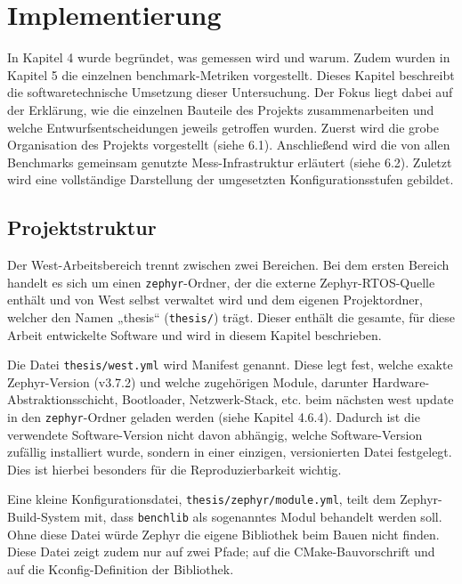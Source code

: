 \chapter{Implementierung}

In Kapitel 4 wurde begründet, was gemessen wird und warum. Zudem wurden in Kapitel 5 die einzelnen benchmark-Metriken vorgestellt. Dieses Kapitel beschreibt die softwaretechnische Umsetzung dieser Untersuchung. Der Fokus liegt dabei auf der Erklärung, wie die einzelnen Bauteile des Projekts zusammenarbeiten und welche Entwurfsentscheidungen jeweils getroffen wurden. Zuerst wird die grobe Organisation des Projekts vorgestellt (siehe 6.1). Anschließend wird die von allen Benchmarks gemeinsam genutzte Mess-Infrastruktur erläutert (siehe 6.2). Zuletzt wird eine vollständige Darstellung der umgesetzten Konfigurationsstufen gebildet.

\section{Projektstruktur}
Der West-Arbeitsbereich trennt zwischen zwei Bereichen. Bei dem ersten Bereich handelt es sich um einen \lstinline[style=fileinline]|zephyr|-Ordner, der die externe Zephyr-RTOS-Quelle enthält und von West selbst verwaltet wird und dem eigenen Projektordner, welcher den Namen „thesis“ (\lstinline[style=fileinline]|thesis/|) trägt. Dieser enthält die gesamte, für diese Arbeit entwickelte Software und wird in diesem Kapitel beschrieben.

Die Datei \lstinline[style=fileinline]|thesis/west.yml| wird Manifest genannt. Diese legt fest, welche exakte Zephyr-Version (v3.7.2) und welche zugehörigen Module, darunter Hardware-Abstraktionsschicht, Bootloader, Netzwerk-Stack, etc. beim nächsten west update in den \lstinline[style=fileinline]|zephyr|-Ordner geladen werden (siehe Kapitel 4.6.4). Dadurch ist die verwendete Software-Version nicht davon abhängig, welche Software-Version zufällig installiert wurde, sondern in einer einzigen, versionierten Datei festgelegt. Dies ist hierbei besonders für die Reproduzierbarkeit wichtig.

Eine kleine Konfigurationsdatei, \lstinline[style=fileinline]|thesis/zephyr/module.yml|, teilt dem Zephyr-Build-System mit, dass \lstinline[style=fileinline]|benchlib| als sogenanntes Modul behandelt werden soll. Ohne diese Datei würde Zephyr die eigene Bibliothek beim Bauen nicht finden. Diese Datei zeigt zudem nur auf zwei Pfade; auf die CMake-Bauvorschrift und auf die Kconfig-Definition der Bibliothek.

